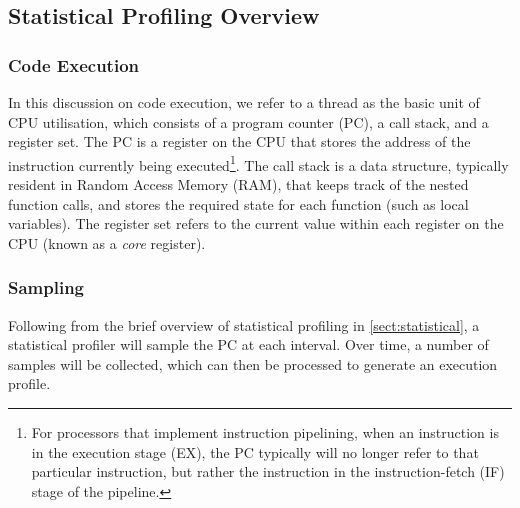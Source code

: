 \subsection{Statistical Profiling Overview}\label{sect:statistical_profiling}

\subsubsection{Code Execution}

In this discussion on code execution, we refer to a thread as the basic unit of CPU utilisation, which consists of a program counter (PC), a call stack, and a register set. The PC is a register on the CPU that stores the address of the instruction currently being executed\footnote{For processors that implement instruction pipelining, when an instruction is in the execution stage (EX), the PC typically will no longer refer to that particular instruction, but rather the instruction in the instruction-fetch (IF) stage of the pipeline.}. The call stack is a data structure, typically resident in Random Access Memory (RAM), that keeps track of the nested function calls, and stores the required state for each function (such as local variables). The register set refers to the current value within each register on the CPU (known as a \textit{core} register). 

\subsubsection{Sampling}

Following from the brief overview of statistical profiling in \ref{sect:statistical}, a statistical profiler will sample the PC at each interval. Over time, a number of samples will be collected, which can then be processed to generate an execution profile. 


